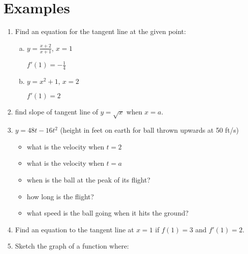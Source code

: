 \documentclass[letterpaper, landscape]{exam}
\begin{document}
  \section{Examples}
  \begin{enumerate}
    \item Find an equation for the tangent line at the given point:
      \begin{enumerate}[(a)]

        \item $y = \frac{x + 2}{x + 1}$, $x = 1$
          \begin{solution}
            $f'(1) = - \frac{1}{4}$
          \end{solution}

        \item $y = x^2 + 1$, $x = 2$
          \begin{solution}
            $f'(1) = 2$
          \end{solution}

      \end{enumerate}

    \item find slope of tangent line of $y = \sqrt{x}$ when $x = a$.

    \item $y = 48 t - 16 t^2$ (height in feet on earth for ball thrown upwards at 50
      ft/s) 

      \begin{itemize}
        \item what is the velocity when $t = 2$
        \item what is the velocity when $t = a$
        \item when is the ball at the peak of its flight?
        \item how long is the flight?
        \item what speed is the ball going when it hits the ground?
      \end{itemize}

    \item Find an equation to the tangent line at $x = 1$ if $f(1) = 3$ and $f'(1) = 2$.

    \item Sketch the graph of a function where:

  \end{enumerate}
\end{document}
